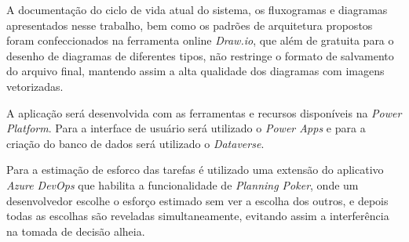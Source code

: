 	A documentação do ciclo de vida atual do sistema, os fluxogramas e diagramas apresentados nesse trabalho, bem como os padrões de arquitetura propostos foram confeccionados
	na ferramenta online \textit{Draw.io}, 
	que além de gratuita para o desenho de diagramas de diferentes 
	tipos, não restringe o formato de salvamento do arquivo final, mantendo 
	assim a alta qualidade dos diagramas com imagens vetorizadas. 
	
	A aplicação será desenvolvida com as ferramentas e recursos disponíveis na \textit{Power Platform}. Para a interface de usuário será utilizado o \textit{Power Apps} e para a
	criação do banco de dados será utilizado o \textit{Dataverse}.

	Para a estimação de esforco das tarefas é utilizado uma extensão do aplicativo \textit{Azure DevOps} que habilita a funcionalidade de \textit{Planning Poker}, onde um desenvolvedor escolhe o esforço estimado
	sem ver a escolha dos outros, e depois todas as escolhas são reveladas simultaneamente, evitando assim a interferência na tomada de decisão alheia.
	
